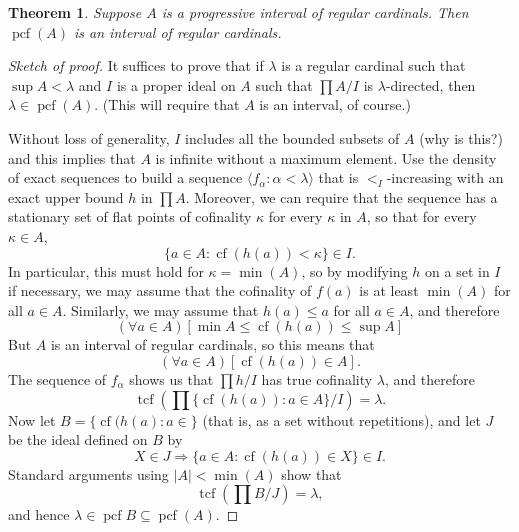 \documentclass[10pt]{amsart}
\theoremstyle{plain}
\newtheorem{theorem}{Theorem}
\theoremstyle{definition}
\theoremstyle{remark}
\DeclareMathOperator{\tcf}{tcf}
\DeclareMathOperator{\cf}{cf}
\DeclareMathOperator{\pcf}{pcf}
\numberwithin{equation}{section}
\begin{document}
\begin{theorem}
Suppose $A$ is a progressive interval of regular cardinals.  Then $\pcf(A)$ is an interval of regular cardinals.
\end{theorem}
\begin{proof}[Sketch of proof]

It suffices to prove that if $\lambda$ is a regular cardinal such that $\sup A <\lambda$ and $I$ is a proper ideal on $A$ such that $\prod A/ I$ is $\lambda$-directed, then $\lambda\in\pcf(A)$. (This will require that $A$ is an interval, of course.)

Without loss of generality, $I$ includes all the bounded subsets of $A$ (why is this?) and this implies that $A$ is infinite without a maximum element.    Use the density of exact sequences to build a sequence $\langle f_\alpha:\alpha<\lambda\rangle$ that is $<_I$-increasing with an exact upper bound $h$ in $\prod A$. Moreover, we can require that the sequence has a stationary set of flat points of cofinality $\kappa$ for every $\kappa$ in $A$, so that for every $\kappa\in A$,
\begin{equation}
\{a\in A: \cf(h(a))<\kappa\}\in I.
\end{equation}
In particular, this must hold for $\kappa = \min(A)$, so by modifying $h$ on a set in $I$ if necessary, we may assume that the cofinality of $f(a)$ is at least $\min(A)$ for all $a\in A$.  Similarly, we may assume that $h(a)\leq a$ for all $a\in A$, and therefore
\begin{equation}
(\forall a\in A)[\min A\leq \cf(h(a))\leq\sup A]
\end{equation}
But $A$ is an interval of regular cardinals, so this means that
\begin{equation}
(\forall a\in A)[\cf(h(a))\in A].
\end{equation}
The sequence of $f_\alpha$ shows us that $\prod h/ I$ has true cofinality $\lambda$, and therefore
\begin{equation}
\tcf\left(\prod \{\cf(h(a)):a\in A\}/ I\right)=\lambda.
\end{equation}
Now let $B = \{\cf(h(a):a\in\}$ (that is, as a set without repetitions), and let $J$ be the ideal defined on $B$ by
\begin{equation}
X\in J\Longrightarrow\{a\in A: \cf(h(a))\in X\}\in I.
\end{equation}
Standard arguments using $|A|<\min(A)$ show that
\begin{equation}
\tcf\left(\prod B/ J\right) = \lambda,
\end{equation}
and hence $\lambda\in \pcf B\subseteq\pcf(A)$.
\end{proof}
\end{document}
